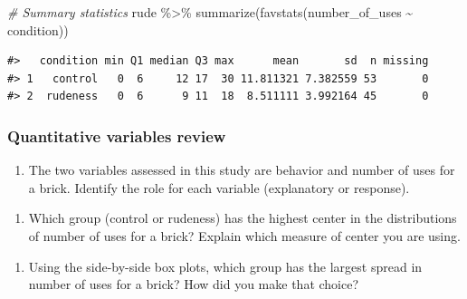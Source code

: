 \documentclass[
]{report}
\newenvironment{Shaded}{\begin{snugshade}}{\end{snugshade}}
\newcommand{\CommentTok}[1]{\textcolor[rgb]{0.56,0.35,0.01}{\textit{#1}}}
\newcommand{\FunctionTok}[1]{\textcolor[rgb]{0.00,0.00,0.00}{#1}}
\newcommand{\NormalTok}[1]{#1}
\newcommand{\SpecialCharTok}[1]{\textcolor[rgb]{0.00,0.00,0.00}{#1}}
\providecommand{\tightlist}{%
  \setlength{\itemsep}{0pt}\setlength{\parskip}{0pt}}
\begin{document}
\begin{Shaded}
\begin{Highlighting}[]
\CommentTok{\# Summary statistics}
\NormalTok{rude }\SpecialCharTok{\%\textgreater{}\%} 
     \FunctionTok{summarize}\NormalTok{(}\FunctionTok{favstats}\NormalTok{(number\_of\_uses }\SpecialCharTok{\textasciitilde{}}\NormalTok{ condition))}
\end{Highlighting}
\end{Shaded}

\begin{verbatim}
#>   condition min Q1 median Q3 max      mean       sd  n missing
#> 1   control   0  6     12 17  30 11.811321 7.382559 53       0
#> 2  rudeness   0  6      9 11  18  8.511111 3.992164 45       0
\end{verbatim}

\hypertarget{quantitative-variables-review}{%
\subsubsection*{Quantitative variables review}\label{quantitative-variables-review}}

\begin{enumerate}
\def\labelenumi{\arabic{enumi}.}
\tightlist
\item
  The two variables assessed in this study are behavior and number of uses for a brick. Identify the role for each variable (explanatory or response).
\end{enumerate}

\vspace{.4in}

\begin{enumerate}
\def\labelenumi{\arabic{enumi}.}
\setcounter{enumi}{1}
\tightlist
\item
  Which group (control or rudeness) has the highest center in the distributions of number of uses for a brick? Explain which measure of center you are using.
\end{enumerate}

\vspace{.4in}

\begin{enumerate}
\def\labelenumi{\arabic{enumi}.}
\setcounter{enumi}{2}
\tightlist
\item
  Using the side-by-side box plots, which group has the largest spread in number of uses for a brick? How did you make that choice?
\end{enumerate}
\end{document}
